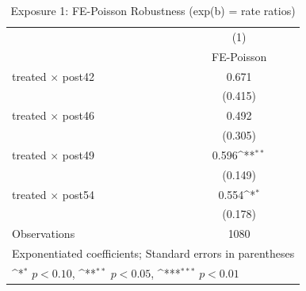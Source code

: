 \begin{table}[htbp]\centering
\def\sym#1{\ifmmode^{#1}\else\(^{#1}\)\fi}
\caption{Exposure 1: FE-Poisson Robustness (exp(b) = rate ratios)}
\begin{tabular}{l*{1}{c}}
\hline\hline
                    &\multicolumn{1}{c}{(1)}\\
                    &\multicolumn{1}{c}{FE-Poisson}\\
\hline
treated $\times$ post42&       0.671         \\
                    &     (0.415)         \\
[1em]
treated $\times$ post46&       0.492         \\
                    &     (0.305)         \\
[1em]
treated $\times$ post49&       0.596\sym{**} \\
                    &     (0.149)         \\
[1em]
treated $\times$ post54&       0.554\sym{*}  \\
                    &     (0.178)         \\
\hline
Observations        &        1080         \\
\hline\hline
\multicolumn{2}{l}{\footnotesize Exponentiated coefficients; Standard errors in parentheses}\\
\multicolumn{2}{l}{\footnotesize \sym{*} \(p<0.10\), \sym{**} \(p<0.05\), \sym{***} \(p<0.01\)}\\
\end{tabular}
\end{table}

